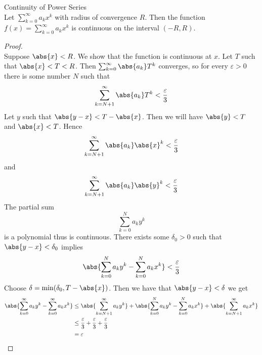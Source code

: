 \documentclass[a4paper]{article}
\begin{document}
\begin{prp}{Continuity of Power Series}{}\\ Let $\sum_{k=0}^{\infty}a_kx^k$ with radius of convergence $R$. Then the function $f(x)=\sum_{k=0}^{\infty}a_kx^k$ is continuous on the interval $(-R,R)$. 
\begin{proof}\\ Suppose $\abs{x}<R$. We show that the function is continuous at $x$. Let $T$ such that $\abs{x}<T<R$. Then $\sum_{k=0}^\infty\abs{a_k}T^k$ converges, so for every $\varepsilon>0$ there is some number $N$ such that $$\sum_{k=N+1}^\infty\abs{a_k}T^k<\frac{\varepsilon}{3}$$ Let $y$ such that $\abs{y-x}<T-\abs{x}$. Then we will have $\abs{y}<T$ and $\abs{x}<T$. Hence $$\sum_{k=N+1}^\infty\abs{a_k}\abs{x}^k<\frac{\varepsilon}{3}$$ and $$\sum_{k=N+1}^\infty\abs{a_k}\abs{y}^k<\frac{\varepsilon}{3}$$ The partial sum $$\sum_{k=0}^Na_ky^k$$ is a polynomial thus is continuous. There exists some $\delta_0>0$ such that $\abs{y-x}<\delta_0$ implies $$\abs{\sum_{k=0}^Na_ky^k-\sum_{k=0}^Na_kx^k}<\frac{\varepsilon}{3}$$ Choose $\delta=\min(\delta_0,T-\abs{x})$. Then we have that $\abs{y-x}<\delta$ we get 
\begin{align*}
\abs{\sum_{k=0}^\infty a_ky^k-\sum_{k=0}^\infty a_kx^k}&\leq\abs{\sum_{k=N+1}^\infty a_ky^k}+\abs{\sum_{k=0}^Na_ky^k-\sum_{k=0}^Na_kx^k}+\abs{\sum_{k=N+1}^\infty a_kx^k}\\
&\leq\frac{\varepsilon}{3}+\frac{\varepsilon}{3}+\frac{\varepsilon}{3}\\
&=\varepsilon
\end{align*}
\end{proof}
\end{prp}
\end{document}
